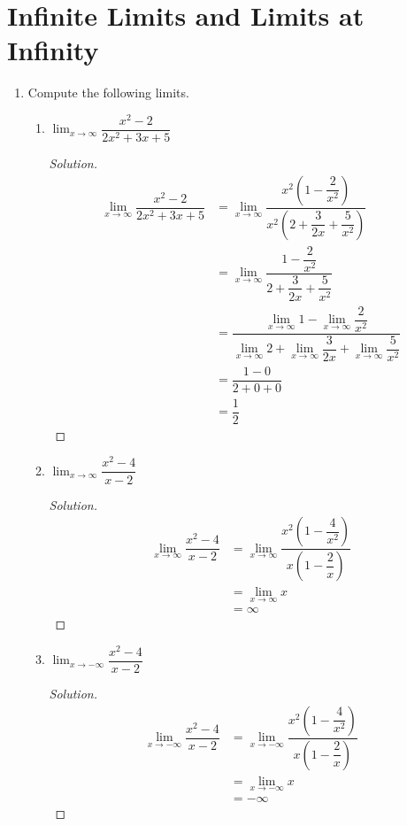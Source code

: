 \documentclass[12pt]{article}
\newenvironment{solution}{\begin{proof}[Solution]}{\end{proof}}
\begin{document}
	\section{Infinite Limits and Limits at Infinity}
	\begin{enumerate}
		\item Compute the following limits.
		\begin{enumerate}
			\item $\displaystyle{\lim_{x\to\infty} \dfrac{x^2-2}{2x^2+3x+5}}$
			\begin{solution}
				\begin{align*}
				\displaystyle{\lim_{x\to\infty} \dfrac{x^2-2}{2x^2+3x+5}}&=\displaystyle{\lim_{x\to\infty} \dfrac{x^2(1-\dfrac{2}{x^2})}{x^2(2+\dfrac{3}{2x}+\dfrac{5}{x^2})}}\\	
				&=\displaystyle{\lim_{x\to\infty} \dfrac{1-\dfrac{2}{x^2}}{2+\dfrac{3}{2x}+\dfrac{5}{x^2}}}\\
				&=\dfrac{\displaystyle{\lim_{x\to\infty} 1}-\displaystyle{\lim_{x\to\infty}\dfrac{2}{x^2} }}{\displaystyle{\lim_{x\to\infty}2}+\displaystyle{\lim_{x\to\infty} \dfrac{3}{2x}}+\displaystyle{\lim_{x\to\infty}\dfrac{5}{x^2}}}\\
				&=\dfrac{1-0}{2+0+0}\\
				&=\dfrac{1}{2}
				\end{align*}	
			\end{solution}
			\item $\displaystyle{\lim_{x\to \infty} \dfrac{x^2-4}{x-2}}$
			\begin{solution}
				\begin{align*}
					\displaystyle{\lim_{x\to\infty} \dfrac{x^2-4}{x-2}}&= \displaystyle{\lim_{x\to\infty} \dfrac{x^2(1-\dfrac{4}{x^2})}{x(1-\dfrac{2}{x})}}\\
					&= \displaystyle{\lim_{x\to\infty} x}\\
					&=\infty
				\end{align*}
			\end{solution}
			\item $\displaystyle{\lim_{x\to -\infty} \dfrac{x^2-4}{x-2}}$
			\begin{solution}
				\begin{align*}
					\displaystyle{\lim_{x\to-\infty} \dfrac{x^2-4}{x-2}}&= \displaystyle{\lim_{x\to-\infty} \dfrac{x^2(1-\dfrac{4}{x^2})}{x(1-\dfrac{2}{x})}}\\
					&= \displaystyle{\lim_{x\to-\infty} x}\\
					&=-\infty
				\end{align*}

\end{solution}
\end{enumerate}
\end{enumerate}
\end{document}
